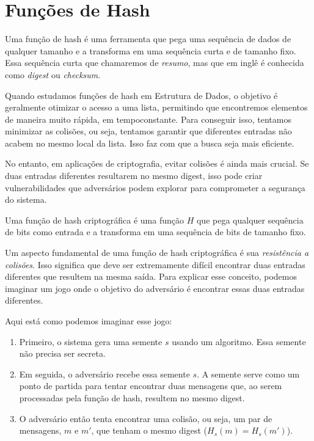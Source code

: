 \chapter{Funções de Hash}
\label{cha:hash}

Uma função de hash é uma ferramenta que pega uma sequência de dados de qualquer tamanho e a transforma em uma sequência curta e de tamanho fixo.
Essa sequência curta que chamaremos de {\em resumo}, mas que em inglê é conhecida como {\em digest} ou {\em checksum}.

Quando estudamos funções de hash em Estrutura de Dados, o objetivo é geralmente otimizar o acesso a uma lista, permitindo que encontremos elementos de maneira muito rápida, em tempoconstante.
Para conseguir isso, tentamos minimizar as colisões, ou seja, tentamos garantir que diferentes entradas não acabem no mesmo local da lista. Isso faz com que a busca seja mais eficiente.

No entanto, em aplicações de criptografia, evitar colisões é ainda mais crucial.
Se duas entradas diferentes resultarem no mesmo digest, isso pode criar vulnerabilidades que adversários podem explorar para comprometer a segurança do sistema.

Uma função de hash criptográfica é uma função $H$ que pega qualquer sequência de bits como entrada e a transforma em uma sequência de bits de tamanho fixo.

Um aspecto fundamental de uma função de hash criptográfica é sua {\em resistência a colisões}.
Isso significa que deve ser extremamente difícil encontrar duas entradas diferentes que resultem na mesma saída.
Para explicar esse conceito, podemos imaginar um jogo onde o objetivo do adversário é encontrar essas duas entradas diferentes.

Aqui está como podemos imaginar esse jogo:
\begin{enumerate}
\item Primeiro, o sistema gera uma semente $s$ usando um algoritmo.
  Essa semente não precisa ser secreta.
    
\item Em seguida, o adversário recebe essa semente $s$.
  A semente serve como um ponto de partida para tentar encontrar duas mensagens que, ao serem processadas pela função de hash, resultem no mesmo digest.
    
\item O adversário então tenta encontrar uma colisão, ou seja, um par de mensagens, $m$ e $m'$, que tenham o mesmo digest ($H_s(m) = H_s(m')$).
\end{enumerate}

